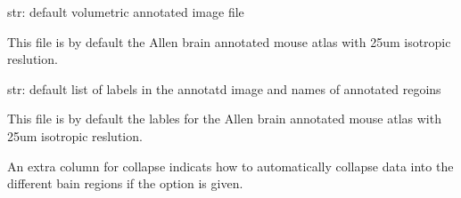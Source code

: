 \documentclass[letterpaper,10pt,english]{sphinxmanual}
\begin{document}
\begin{fulllineitems}
\label{api/ClearMap.Analysis:ClearMap.Analysis.Label.DefaultLabeledImageFile}
str: default volumetric annotated image file

This file is by default the Allen brain annotated mouse atlas with 25um
isotropic reslution.

\end{fulllineitems}


\begin{fulllineitems}
\label{api/ClearMap.Analysis:ClearMap.Analysis.Label.DefaultAnnotationFile}
str: default list of labels in the annotatd image and names of annotated regoins

This file is by default the lables for the Allen brain annotated mouse
atlas with 25um isotropic reslution.

An extra column for collapse indicats how to automatically collapse data into
the different bain regions if the  option is given.

\end{fulllineitems}

\end{document}
